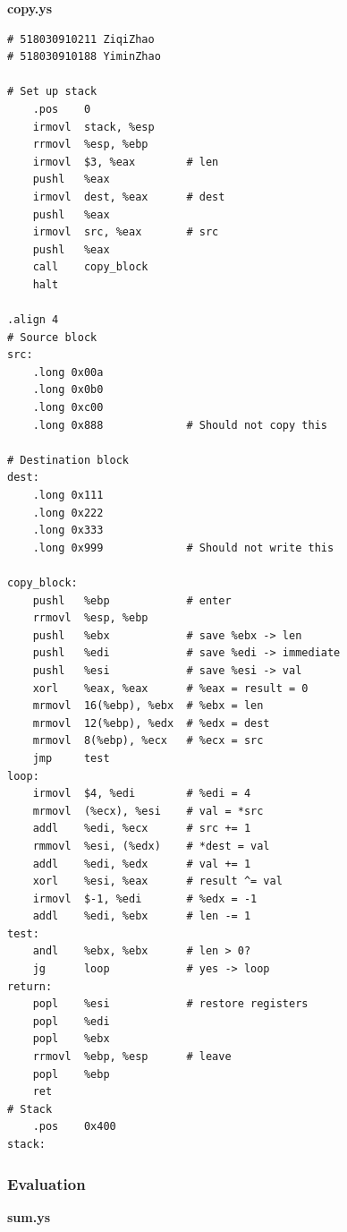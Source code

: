 \documentclass{article}
\begin{document}
\begin{center}
        \textbf{copy.ys}
\end{center}
\begin{lstlisting}
# 518030910211 ZiqiZhao
# 518030910188 YiminZhao

# Set up stack
    .pos    0
    irmovl  stack, %esp
    rrmovl  %esp, %ebp
    irmovl  $3, %eax        # len
    pushl   %eax
    irmovl  dest, %eax      # dest
    pushl   %eax
    irmovl  src, %eax       # src
    pushl   %eax
    call    copy_block
    halt

.align 4
# Source block
src:
    .long 0x00a
    .long 0x0b0
    .long 0xc00
    .long 0x888             # Should not copy this

# Destination block
dest:
    .long 0x111
    .long 0x222
    .long 0x333
    .long 0x999             # Should not write this

copy_block:
    pushl   %ebp            # enter
    rrmovl  %esp, %ebp
    pushl   %ebx            # save %ebx -> len
    pushl   %edi            # save %edi -> immediate
    pushl   %esi            # save %esi -> val
    xorl    %eax, %eax      # %eax = result = 0
    mrmovl  16(%ebp), %ebx  # %ebx = len
    mrmovl  12(%ebp), %edx  # %edx = dest
    mrmovl  8(%ebp), %ecx   # %ecx = src
    jmp     test
loop:
    irmovl  $4, %edi        # %edi = 4
    mrmovl  (%ecx), %esi    # val = *src
    addl    %edi, %ecx      # src += 1
    rmmovl  %esi, (%edx)    # *dest = val
    addl    %edi, %edx      # val += 1
    xorl    %esi, %eax      # result ^= val
    irmovl  $-1, %edi       # %edx = -1
    addl    %edi, %ebx      # len -= 1
test:
    andl    %ebx, %ebx      # len > 0?
    jg      loop            # yes -> loop
return:
    popl    %esi            # restore registers
    popl    %edi
    popl    %ebx
    rrmovl  %ebp, %esp      # leave
    popl    %ebp
    ret
# Stack 
    .pos    0x400
stack:
\end{lstlisting}
\pagebreak
\subsubsection{Evaluation}
\textbf{sum.ys}\\
\end{document}
